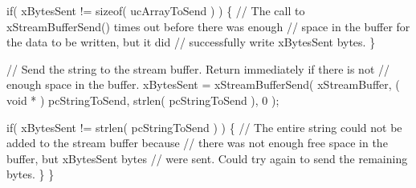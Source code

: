 \begin{DoxyPre}    if( xBytesSent != sizeof( ucArrayToSend ) )
    \{
        // The call to xStreamBufferSend() times out before there was enough
        // space in the buffer for the data to be written, but it did
        // successfully write xBytesSent bytes.
    \}\end{DoxyPre}



\begin{DoxyPre}    // Send the string to the stream buffer.  Return immediately if there is not
    // enough space in the buffer.
    xBytesSent = xStreamBufferSend( xStreamBuffer, ( void * ) pcStringToSend, strlen( pcStringToSend ), 0 );\end{DoxyPre}



\begin{DoxyPre}    if( xBytesSent != strlen( pcStringToSend ) )
    \{
        // The entire string could not be added to the stream buffer because
        // there was not enough free space in the buffer, but xBytesSent bytes
        // were sent.  Could try again to send the remaining bytes.
    \}
\}
\end{DoxyPre}
 